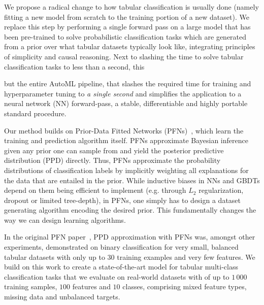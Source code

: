 \documentclass{article}
\begin{document}
We propose a radical change to how tabular classification is usually done (namely fitting a new model from scratch to the training portion of a new dataset). We replace this step by performing a single forward pass on a large model that has been pre-trained to solve probabilistic classification tasks which are generated from a prior over what tabular datasets typically look like, integrating principles of simplicity and causal reasoning.
Next to slashing the time to solve tabular classification tasks to less than a second, this 

but the entire AutoML pipeline, that slashes the required time for training and hyperparameter tuning to \textit{a single second} and simplifies the application to a neural network (NN) forward-pass, a stable, differentiable and highly portable standard procedure.


Our method builds on Prior-Data Fitted Networks (PFNs)~\citep{muller-iclr22a}, which learn the training and prediction algorithm itself.
PFNs approximate Bayesian inference given any prior one can sample from and yield the posterior predictive distribution (PPD) directly. 
Thus, PFNs approximate the probability distributions of classification labels by implicitly weighting all explanations for the data that are entailed in the prior.
While inductive biases in NNs and GBDTs depend on them being efficient to implement (e.g. through $L_2$ regularization, dropout \citep{srivastava-jmlr14a} or limited tree-depth), in PFNs, one simply has to design a dataset generating algorithm encoding the desired prior. This fundamentally changes the way we can design learning algorithms.

In the original PFN paper~\citep{muller-iclr22a}, PPD approximation with PFNs was, amongst other experiments, demonstrated on binary classification for very small, balanced tabular datasets with only up to $30$ training examples and very few features.
We build on this work to create a state-of-the-art model for tabular multi-class classification tasks that we evaluate on real-world datasets with of up to $1\,000$ training samples, $100$ features and $10$ classes, comprising mixed feature types, missing data and unbalanced targets.
\end{document}

